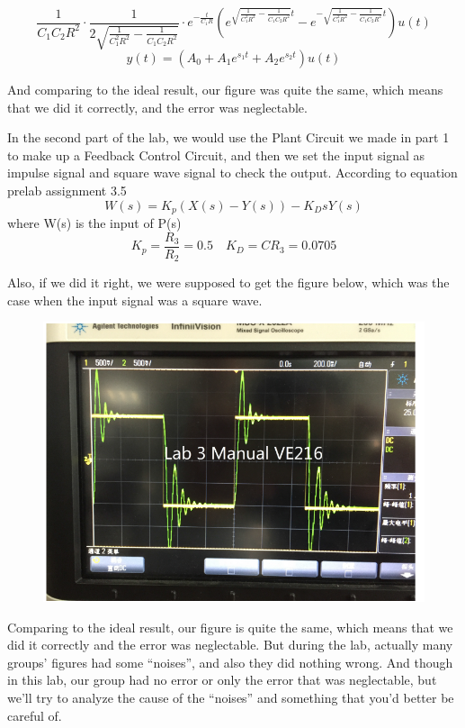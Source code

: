 \documentclass[12pt]{article}
\begin{document}
\begin{equation}
\frac{1}{C_1 C_2 R^2}\cdot\frac{1}{2\sqrt{\frac{1}{C_1^2R^2}-\frac{1}{C_1C_2R^2}}}\cdot e^{-\frac{t}{C_1R}}(e^{\sqrt{\frac{1}{C_1^2R^2}-\frac{1}{C_1C_2R^2}}t}-e^{-\sqrt{\frac{1}{C_1^2R^2}-\frac{1}{C_1C_2R^2}}t})u(t)
\end{equation}
\begin{equation}
y(t)=(A_0+A_1e^{s_1t}+A_2e^{s_2t})u(t)
\end{equation}
\par And comparing to the ideal result, our figure was quite the same, which means that we did it correctly, and the error was neglectable.
\par In the second part of the lab, we would use the Plant Circuit we made in part 1 to make up a Feedback Control Circuit, and then we set the input signal as impulse signal and square wave signal to check the output. According to equation prelab assignment 3.5 
\begin{equation}
W(s)=K_p(X(s)-Y(s))-K_DsY(s)
\end{equation}
where W(s) is the input of P(s)
$$K_p=\frac{R_3}{R_2}=0.5\quad K_D=CR_3=0.0705$$
\par Also, if we did it right, we were supposed to get the figure below, which was the case when the input signal was a square wave.
\begin{figure}[H]
\centering
\includegraphics[scale=0.5]{P7.jpg}
\end{figure}
Comparing to the ideal result, our figure is quite the same, which means that we did it correctly and the error was neglectable. But during the lab, actually many groups’ figures had some “noises”, and also they did nothing wrong. And though in this lab, our group had no error or only the error that was neglectable, but we'll try to analyze the cause of the “noises” and something that you’d better be careful of.
\end{document}

